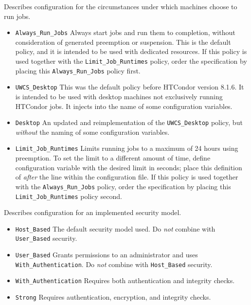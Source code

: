 \begin{description}
\label{usecategory:POLICY}
\item[\MacroNI{POLICY}]
  Describes configuration for the circumstances under which
  machines choose to run jobs.
  \begin{itemize}
    \item \texttt{Always\_Run\_Jobs}
    Always start jobs and run them to completion, without consideration of
     generated preemption or suspension.
    This is the default policy, and it is intended to be used with dedicated
    resources.
    If this policy is used together with the \texttt{Limit\_Job\_Runtimes}
    policy,
    order the specification by placing this \texttt{Always\_Run\_Jobs} 
    policy first. 
    \item \texttt{UWCS\_Desktop}
    This was the default policy before HTCondor version 8.1.6.
    It is intended to be used with desktop machines not exclusively running
    HTCondor jobs.
    It injects  into the name of some configuration variables.
    \item \texttt{Desktop}
    An updated and reimplementation of the \texttt{UWCS\_Desktop} policy,
    but \emph{without} the  naming of some configuration variables.
    \item \texttt{Limit\_Job\_Runtimes}
    Limits running jobs to a maximum of 24 hours using preemption.
    To set the limit to a different amount of time, 
    define configuration variable 
    with the desired limit in seconds;
    place this definition of  \emph{after} the
     line within the configuration
    file.  
    If this policy is used together with the \texttt{Always\_Run\_Jobs} policy,
    order the specification by placing this \texttt{Limit\_Job\_Runtimes} 
    policy second. 
  \end{itemize}

\label{usecategory:SECURITY}
\item[\MacroNI{SECURITY}]
  Describes configuration for an implemented security model.
  \begin{itemize}
    \item \texttt{Host\_Based}
    The default security model used.
    Do \emph{not} combine with \texttt{User\_Based} security.
    \item \texttt{User\_Based}
    Grants permissions to an administrator and uses 
    \texttt{With\_Authentication}.
    Do \emph{not} combine with \texttt{Host\_Based} security.
    \item \texttt{With\_Authentication}
    Requires both authentication and integrity checks.
    \item \texttt{Strong}
    Requires authentication, encryption, and integrity checks.
  \end{itemize}

\end{description}

